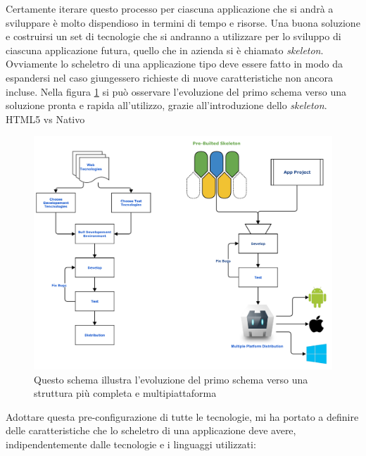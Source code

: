 Certamente iterare questo processo per ciascuna applicazione che si andrà a sviluppare è molto dispendioso in termini di tempo e risorse. Una buona soluzione e costruirsi un set di tecnologie che si andranno a utilizzare per lo sviluppo di ciascuna applicazione futura, quello che in azienda si è chiamato \emph{skeleton}. Ovviamente lo scheletro di una applicazione tipo deve essere fatto in modo da espandersi nel caso giungessero richieste di nuove caratteristiche non ancora incluse. Nella figura \ref{fig:flow_match} si può osservare l'evoluzione del primo schema verso una soluzione pronta e rapida all'utilizzo, grazie all'introduzione dello \emph{skeleton}.
HTML5 vs Nativo

\begin{figure}
	\begin{center}
		\includegraphics[scale=0.5]{Figures/match_flow.pdf}
		\caption[Schemi di sviluppo a confronto]{Questo schema illustra l'evoluzione del primo schema verso una struttura più completa e multipiattaforma}
		\label{fig:flow_match}
	\end{center}
\end{figure}

Adottare questa pre-configurazione di tutte le tecnologie, mi ha portato a definire delle caratteristiche che lo scheletro di una applicazione deve avere, indipendentemente dalle tecnologie e i linguaggi utilizzati:

